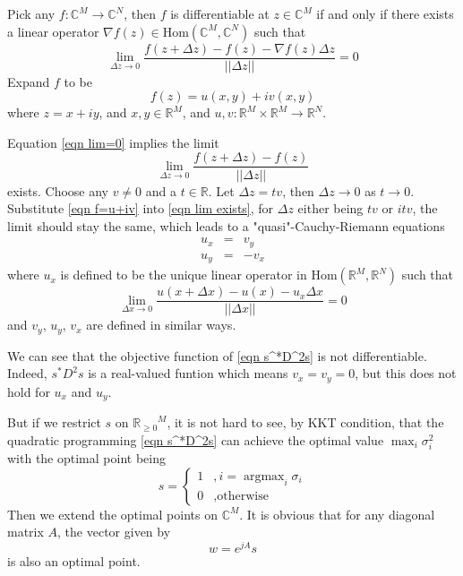 \documentclass[12pt]{article}
\theoremstyle{remark}
\DeclareMathOperator*{\argmax}{argmax}
\begin{document}
Pick any $f:\mathbb{C}^M\rightarrow\mathbb{C}^N$, then $f$ is differentiable at $z\in\mathbb{C}^M$ if and only if there exists a linear operator $\nabla f(z)\in\mbox{Hom}\left(\mathbb{C}^M,\mathbb{C}^N \right)$ such that
\begin{equation}
	\lim_{\Delta z\rightarrow0}\frac{f(z+\Delta z)-f(z)-\nabla f(z)\Delta z}{||\Delta z||}=0\label{eqn lim=0}
\end{equation}
Expand $f$ to be 
\begin{equation}
	f(z)=u(x,y)+iv(x,y)\label{eqn f=u+iv}
\end{equation}
where $z=x+iy$, and $x,y\in\mathbb{R}^M$, and $u,v:\mathbb{R}^M\times\mathbb{R}^M\rightarrow\mathbb{R}^N$.

Equation \ref{eqn lim=0} implies the limit
\begin{equation}
	\lim_{\Delta z\rightarrow0}\frac{f(z+\Delta z)-f(z)}{||\Delta z||}\label{eqn lim exists}
\end{equation}
exists. Choose any $v\not=0$ and a $t\in\mathbb{R}$. Let $\Delta z=tv$, then $\Delta z\rightarrow0$ as $t\rightarrow0$. Substitute \ref{eqn f=u+iv} into \ref{eqn lim exists}, for $\Delta z$ either being $tv$ or $itv$, the limit should stay the same, which leads to a "quasi"-Cauchy-Riemann equations
\begin{eqnarray*}
	u_x&=&v_y\\
	u_y&=&-v_x
\end{eqnarray*}
where $u_x$ is defined to be the unique linear operator in $\mbox{Hom}\left(\mathbb{R}^M,\mathbb{R}^N\right)$ such that
$$\lim_{\Delta x\rightarrow0}\frac{u(x+\Delta x)-u(x)-u_x\Delta x}{||\Delta x||}=0$$
and $v_y$, $u_y$, $v_x$ are defined in similar ways.

We can see that the objective function of \ref{eqn s^*D^2s} is not differentiable. Indeed, $s^*D^2s$ is a real-valued funtion which means $v_x=v_y=0$, but this does not hold for $u_x$ and $u_y$.

But if we restrict $s$ on ${\mathbb{R}_{\geq0}}^M$, it is not hard to see, by KKT condition, that the quadratic programming \ref{eqn s^*D^2s} can achieve the optimal value $\max_i \sigma_i^2$ with the optimal point being
$$
s=\left\{ 
\begin{matrix}
	1&,i=\argmax_i\sigma_i\\
	0&,\mbox{otherwise}	
\end{matrix}
\right.
$$
Then we extend the optimal points on $\mathbb{C}^M$. It is obvious that for any diagonal matrix $A$, the vector given by
$$w=e^{jA}s$$
is also an optimal point.
\end{document}
